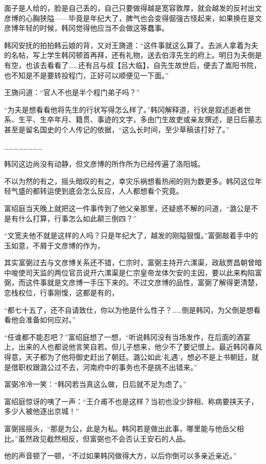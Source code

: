 面子是人给的，脸是自己丢的，自己只要做得越是宽容敦厚，就会越发的反衬出文彦博的心胸狭隘——毕竟是年纪大了，脾气也会变得倔强古怪起来，如果换在是文彦博年轻的时候，韩冈觉得他应当不会做这等蠢事。

韩冈安抚的拍拍韩云娘的背，又对王旖道：“这件事就这么算了。去派人拿着为夫的名帖，写上学生韩冈顿首再拜，还有礼物，送去伯淳先生的府上。明日为夫倒是有空，也该去看看了……还有吕与叔【吕大临】，自先生故世后，便去了嵩阳书院，也不知是不是要转投程门，正好可以顺便见一下面。”

王旖问道：“官人不也是半个程门弟子吗？”

“为夫是想看看他将先生的行状写得怎么样了。”韩冈解释道，行状是叙述逝者世系、生平、生卒年月、籍贯、事迹的文字，多由门生故吏或亲友撰述，是日后墓志甚至是留名国史的个人传记的依据，“这么长时间，至少草稿该打好了。”

……………………

韩冈这边尚没有动静，但文彦博的所作所为已经传遍了洛阳城。

不以为然的有之，摇头暗叹的有之，幸灾乐祸想看热闹的则为数更多。韩冈这位年轻气盛的都转运使到底会怎么反应，人人都想看个究竟。

富绍庭当天晚上就把这一件事传到了他父亲那里，还疑惑不解的问道，“潞公是不是有什么打算，行事怎么如此颠三倒四？”

“文宽夫他不就是这样的人吗？只是年纪大了，越发的刚隘狠愎。”富弼敲着手中的玉如意，不屑于文彦博的作为，

其实富弼过去与文彦博关系还不错，仁宗时，富弼主持开六漯渠，政敌贾昌朝曾暗中唆使司天监的两位官员说开六漯渠是仁宗皇帝龙体欠安的主因，要以此来构陷富弼，而这件事就是文彦博一手压下来的。不过文彦博的品性，富弼了解得更清楚，恋栈权位，行事刚愎，这都是有的，

“都七十五了，还不自请致仕，你以为他是什么性子？……倒是韩冈，为父倒是想看看他会准备如何应对。”

“任谁都不能忍吧？”富绍庭想了一想，“听说韩冈没有当场发作，在后面的酒宴上，出来的人也都说他言笑自若。但儿子想来，他少不了要记恨上。最近韩冈春风得意，天子都为了他将御史赶出了朝廷。潞公如此‘礼遇’，想必不是上书朝廷，就是借职权跟潞公过不去，河南府中的事务也不是挑不出错来。”

富弼冷冷一笑：“韩冈若当真这么做，日后就不足为虑了。”

富绍庭惊讶的咦了一声：“王介甫不也是这样？当初也没少辞相、称病要挟天子，多少人被他逐出京城！”

富弼摇摇头，“那是为公，此是为私。韩冈若是做出此事，哪里能与他岳父相比。”虽然政见截然相反，但富弼也不会否认王安石的人品。

他的声音顿了一顿，“不过如果韩冈做得大方，以后你倒可以多亲近亲近。”

